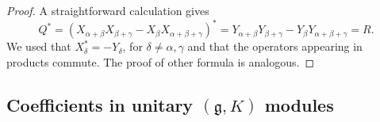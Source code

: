 \documentclass[twoside,a4paper,12pt]{article}
\newcommand{\g}{\ensuremath{\mathfrak g}}
\theoremstyle{definition}
\begin{document}
\begin{proof}
	A straightforward calculation gives
	\begin{equation*}
		Q^*=(X_{\alpha+\beta}X_{\beta+\gamma}-X_\beta X_{\alpha+\beta+\gamma})^*
		=Y_{\alpha+\beta}Y_{\beta+\gamma}-Y_\beta Y_{\alpha+\beta+\gamma}=R.
	\end{equation*}
	We used that $X_\delta^*=-Y_\delta$, for $\delta\neq\alpha,\gamma$
	and that the operators appearing in products commute.
	The proof of other formula is analogous.
\end{proof}



\subsection{Coefficients in unitary $(\g,K)$ modules}
\end{document}
